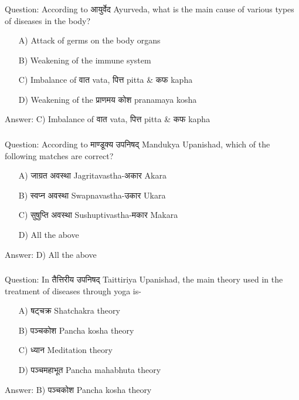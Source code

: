 \begin{frame}[fragile]\frametitle{}

Question: According to आयुर्वेद Ayurveda, what is the main cause of various types of diseases in the body?

\begin{itemize}
\item[A)] Attack of germs on the body organs
\item[B)] Weakening of the immune system
\item[C)] Imbalance of वात vata, पित्त pitta \& कफ kapha
\item[D)] Weakening of the प्राणमय कोश pranamaya kosha
\end{itemize}

Answer: C) Imbalance of वात vata, पित्त pitta \& कफ kapha
\end{frame}

\begin{frame}[fragile]\frametitle{}

Question: According to माण्डूक्य उपनिषद् Mandukya Upanishad, which of the following matches are correct?

\begin{itemize}
\item[A)] जाग्रत अवस्था Jagritavastha-अकार Akara
\item[B)] स्वप्न अवस्था Swapnavastha-उकार Ukara
\item[C)] सुषुप्ति अवस्था Sushuptivastha-मकार Makara
\item[D)] All the above
\end{itemize}

Answer: D) All the above
\end{frame}

\begin{frame}[fragile]\frametitle{}

Question: In तैत्तिरीय उपनिषद् Taittiriya Upanishad, the main theory used in the treatment of diseases through yoga is-

\begin{itemize}
\item[A)] षट्चक्र Shatchakra theory
\item[B)] पञ्चकोश Pancha kosha theory
\item[C)] ध्यान Meditation theory
\item[D)] पञ्चमहाभूत Pancha mahabhuta theory
\end{itemize}

Answer: B) पञ्चकोश Pancha kosha theory
\end{frame}

